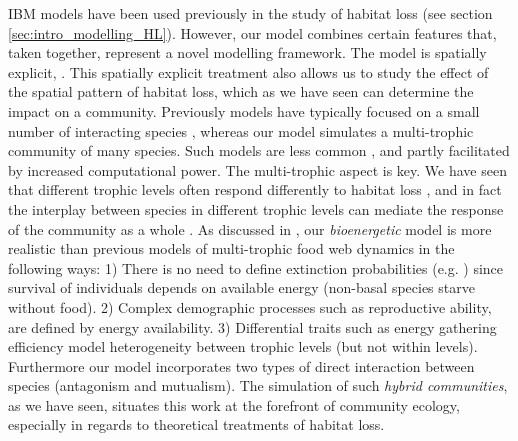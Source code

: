 IBM models have been used previously in the study of habitat loss (see section \ref{sec:intro_modelling_HL}). However, our model combines certain features that, taken together, represent a novel modelling framework. The model is spatially explicit, . This spatially explicit treatment also allows us to study the effect of the spatial pattern of habitat loss, which as we have seen can determine the impact on a community. Previously models have typically focused on a small number of interacting species \cite{klausmeier2001habitat,jager2006simulated,melian2002food}, whereas our model simulates a multi-trophic community of many species. Such models are less common \cite{lurgi2015effects,grimm2013individual}, and partly facilitated by increased computational power. The multi-trophic aspect is key. We have seen that different trophic levels often respond differently to habitat loss \cite{sole2006ecological,duffy2003biodiversity,raffaelli2004extinction}, and in fact the interplay between species in different trophic levels can mediate the response of the community as a whole \cite{sole2006ecological}. As discussed in \cite{lurgi2015effects}, our \emph{bioenergetic} model is more realistic than previous models of multi-trophic food web dynamics \cite{mccann2005dynamics,brose2006allometric,pimm1979complexity} in the following ways: 1) There is no need to define extinction probabilities (e.g. \cite{sole2006ecological,fortuna2013habitat}) since survival of individuals depends on available energy (non-basal species starve without food). 2) Complex demographic processes such as reproductive ability, are defined by energy availability. 3) Differential traits such as energy gathering efficiency model heterogeneity between trophic levels (but not within levels). Furthermore our model incorporates two types of direct interaction between species (antagonism and mutualism). The simulation of such \emph{hybrid communities}, as we have seen, situates this work at the forefront of community ecology, especially in regards to theoretical treatments of habitat loss.        


